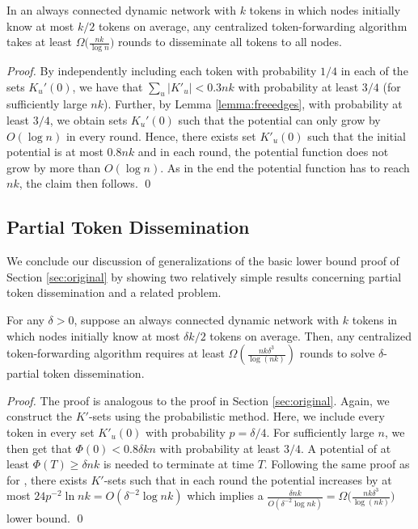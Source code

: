 \documentclass{llncs}
\begin{document}
\begin{theorem}\label{thm:original}
    In an always connected dynamic network with $k$ tokens in
    which nodes initially know at most $k/2$ tokens on average,
    any centralized token-forwarding algorithm takes at least
    $\Omega\big(\frac{nk}{\log n}\big)$ rounds to disseminate all
    tokens to all nodes.
\end{theorem}
 \begin{proof}
     By independently including each token with probability $1/4$ in
     each of the sets $K_u'(0)$, we have that $\sum_u |K'_u| < 0.3 nk$
     with probability at least $3/4$ (for sufficiently large
     $nk$). Further, by Lemma \ref{lemma:freeedges}, with probability
     at least $3/4$, we obtain sets $K_u'(0)$ such that the potential
     can only grow by $O(\log n)$ in every round. Hence, there exists
     set $K'_u(0)$ such that the initial potential is at most $0.8nk$
     and in each round, the potential function does not grow by more
     than $O(\log n)$. As in the end the potential function has to
     reach $nk$, the claim then follows.
 \hspace*{\fill}\qed\end{proof}


\subsection{Partial Token Dissemination}
\label{app:partial}

We conclude our discussion of generalizations of the basic lower bound
proof of Section \ref{sec:original} by showing two relatively simple
results concerning partial token dissemination and a related problem.

\begin{theorem}\label{thm:deltaLB}
    For any $\delta > 0$, suppose an always connected dynamic network
    with $k$ tokens in which nodes initially know at most $\delta k/2$
    tokens on average.  Then, any centralized token-forwarding
    algorithm requires at least $\Omega(\frac{nk\delta^3}{\log(nk)})$
    rounds to solve $\delta$-partial token dissemination.
\end{theorem}
\begin{proof}
    The proof is analogous to the proof in Section
    \ref{sec:original}. Again, we construct the $K'$-sets using the
    probabilistic method. Here, we include every token in every set
    $K'_u(0)$ with probability $p=\delta/4$.  For sufficiently large
    $n$, we then get that $\Phi(0) < 0.8 \delta k n$ with probability
    at least $3/4$. A potential of at least $\Phi(T) \geq \delta nk$
    is needed to terminate at time $T$.  Following the same proof as
    for , there exists $K'$-sets such that in
    each round the potential increases by at most $24 p^{-2} \ln nk =
    O(\delta^{-2} \log nk)$ which implies a $\frac{\delta
        nk}{O(\delta^{-2} \log
        nk)}=\Omega\big(\frac{nk\delta^3}{\log(nk)}\big)$ lower bound.
\hspace*{\fill}\qed\end{proof}
\end{document}
